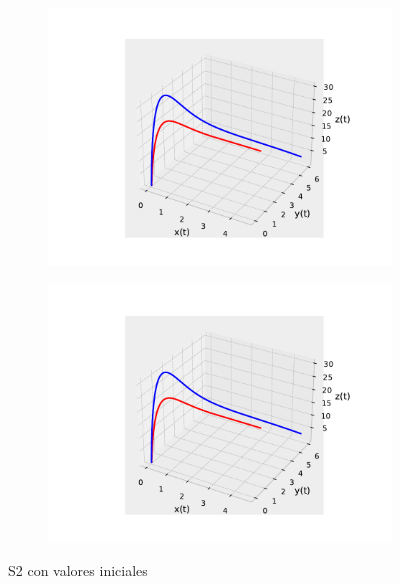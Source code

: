 \documentclass{wscpaperproc}
\theoremstyle{wsc}
\begin{document}
\begin{figure}[htp]
	\centering
	\begin{subfigure}[b]{0.5\textwidth}
		\centering
		\includegraphics[width=\textwidth]{Simulations/S13d.pdf}
	
		\label{fig:comparativa91}
	\end{subfigure}%
	\begin{subfigure}[b]{0.5\textwidth}
		\centering
		\includegraphics[width=\textwidth]{Simulations/S13d.pdf}
		\label{fig:comparativa92}
	\end{subfigure}
	\caption{S2 con valores iniciales}

	\label{fig:comparacion4}
\end{figure}
\end{document}
